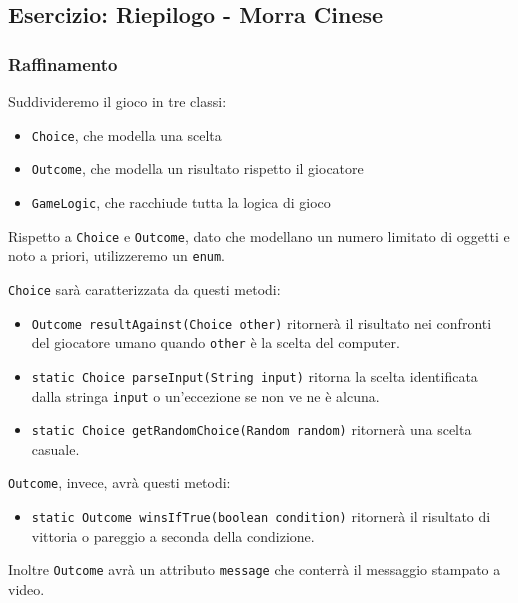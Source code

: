\documentclass{article}
\begin{document}
\subsection{Esercizio: Riepilogo - Morra Cinese}


\subsubsection{Raffinamento}

Suddivideremo il gioco in tre classi: 
\begin{itemize}
	\item \texttt{Choice}, che modella una scelta
	\item \texttt{Outcome}, che modella un risultato rispetto il giocatore
	\item \texttt{GameLogic}, che racchiude tutta la logica di gioco
\end{itemize}

Rispetto a \texttt{Choice} e \texttt{Outcome}, dato che modellano un numero limitato di oggetti e noto a priori,
utilizzeremo un \texttt{enum}.

\texttt{Choice} sarà caratterizzata da questi metodi:
\begin{itemize}
	\item \texttt{Outcome resultAgainst(Choice other)} ritornerà il risultato nei confronti del giocatore umano quando \texttt{other} è la scelta del computer.
	\item \texttt{static Choice parseInput(String input)} ritorna la scelta identificata dalla stringa \texttt{input} o un'eccezione
	se non ve ne è alcuna.
	\item \texttt{static Choice getRandomChoice(Random random)} ritornerà una scelta casuale.
\end{itemize}

\texttt{Outcome}, invece, avrà questi metodi:

\begin{itemize}
	\item \texttt{static Outcome winsIfTrue(boolean condition)} ritornerà il risultato di vittoria o pareggio a seconda della condizione.
\end{itemize}
Inoltre \texttt{Outcome} avrà un attributo \texttt{message} che conterrà il messaggio stampato a video.
\end{document}
